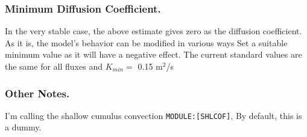 \hypertarget{minimum-diffusion-coefficient.}{%
\subsubsection{Minimum Diffusion
Coefficient.}\label{minimum-diffusion-coefficient.}}

In the very stable case, the above estimate gives zero as the diffusion
coefficient. As it is, the model's behavior can be modified in various
ways Set a suitable minimum value as it will have a negative effect. The
current standard values are the same for all fluxes and \(K_{min}=\)
0.15 m\(^{2}\)/s

\hypertarget{other-notes.}{%
\subsubsection{Other Notes.}\label{other-notes.}}

I'm calling the shallow cumulus convection \texttt{MODULE:{[}SHLCOF{]}},
By default, this is a dummy.
